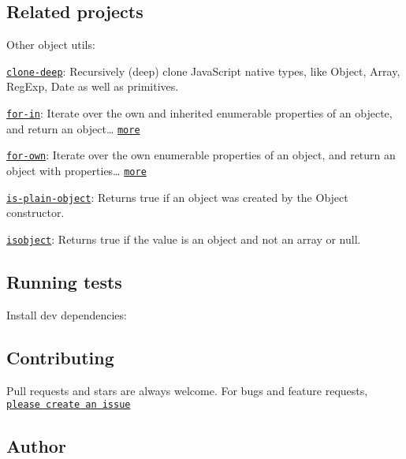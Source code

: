 \subsection*{Related projects}

Other object utils\+:


\begin{DoxyItemize}
\item \href{https://github.com/jonschlinkert/clone-deep}{\tt clone-\/deep}\+: Recursively (deep) clone Java\+Script native types, like Object, Array, Reg\+Exp, Date as well as primitives.
\item \href{https://github.com/jonschlinkert/for-in}{\tt for-\/in}\+: Iterate over the own and inherited enumerable properties of an objecte, and return an object… \href{https://github.com/jonschlinkert/for-in}{\tt more}
\item \href{https://github.com/jonschlinkert/for-own}{\tt for-\/own}\+: Iterate over the own enumerable properties of an object, and return an object with properties… \href{https://github.com/jonschlinkert/for-own}{\tt more}
\item \href{https://github.com/jonschlinkert/is-plain-object}{\tt is-\/plain-\/object}\+: Returns true if an object was created by the {\ttfamily Object} constructor.
\item \href{https://github.com/jonschlinkert/isobject}{\tt isobject}\+: Returns true if the value is an object and not an array or null.
\end{DoxyItemize}

\subsection*{Running tests}

Install dev dependencies\+:




\subsection*{Contributing}

Pull requests and stars are always welcome. For bugs and feature requests, \href{https://github.com/jonschlinkert/is-equal-shallow/issues/new}{\tt please create an issue}

\subsection*{Author}

